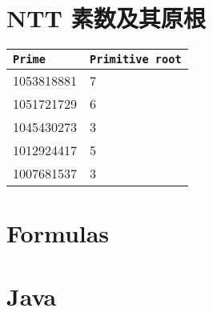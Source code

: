\section{NTT 素数及其原根}
\begin{tabular}{|l|l|}
	\hline
	\texttt{Prime} & \texttt{Primitive root} \\
	\hline
	1053818881 & 7 \\
	\hline
	1051721729 & 6 \\
	\hline
	1045430273 & 3 \\
	\hline
	1012924417 & 5 \\
	\hline
	1007681537 & 3 \\
	\hline
\end{tabular}

\section{Formulas}

\section{Java}
\inputminted{java}{\source/hints/template.java}

